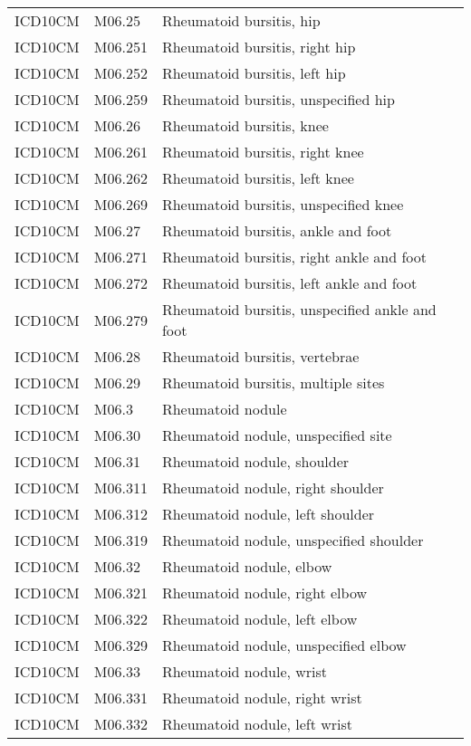 \begin{longtable}{p{}p{}p{}}
  ICD10CM & M06.25 & Rheumatoid bursitis, hip \\ 
  ICD10CM & M06.251 & Rheumatoid bursitis, right hip \\ 
  ICD10CM & M06.252 & Rheumatoid bursitis, left hip \\ 
  ICD10CM & M06.259 & Rheumatoid bursitis, unspecified hip \\ 
  ICD10CM & M06.26 & Rheumatoid bursitis, knee \\ 
  ICD10CM & M06.261 & Rheumatoid bursitis, right knee \\ 
  ICD10CM & M06.262 & Rheumatoid bursitis, left knee \\ 
  ICD10CM & M06.269 & Rheumatoid bursitis, unspecified knee \\ 
  ICD10CM & M06.27 & Rheumatoid bursitis, ankle and foot \\ 
  ICD10CM & M06.271 & Rheumatoid bursitis, right ankle and foot \\ 
  ICD10CM & M06.272 & Rheumatoid bursitis, left ankle and foot \\ 
  ICD10CM & M06.279 & Rheumatoid bursitis, unspecified ankle and foot \\ 
  ICD10CM & M06.28 & Rheumatoid bursitis, vertebrae \\ 
  ICD10CM & M06.29 & Rheumatoid bursitis, multiple sites \\ 
  ICD10CM & M06.3 & Rheumatoid nodule \\ 
  ICD10CM & M06.30 & Rheumatoid nodule, unspecified site \\ 
  ICD10CM & M06.31 & Rheumatoid nodule, shoulder \\ 
  ICD10CM & M06.311 & Rheumatoid nodule, right shoulder \\ 
  ICD10CM & M06.312 & Rheumatoid nodule, left shoulder \\ 
  ICD10CM & M06.319 & Rheumatoid nodule, unspecified shoulder \\ 
  ICD10CM & M06.32 & Rheumatoid nodule, elbow \\ 
  ICD10CM & M06.321 & Rheumatoid nodule, right elbow \\ 
  ICD10CM & M06.322 & Rheumatoid nodule, left elbow \\ 
  ICD10CM & M06.329 & Rheumatoid nodule, unspecified elbow \\ 
  ICD10CM & M06.33 & Rheumatoid nodule, wrist \\ 
  ICD10CM & M06.331 & Rheumatoid nodule, right wrist \\ 
  ICD10CM & M06.332 & Rheumatoid nodule, left wrist \\ 

\end{longtable}
